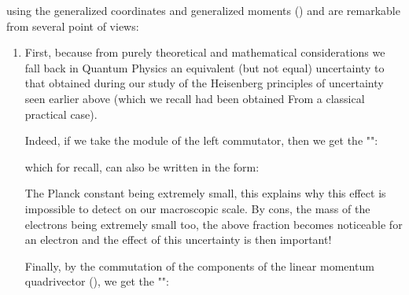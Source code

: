 	using the generalized coordinates and generalized moments () and are remarkable from several point of views:
	\begin{enumerate}
		\item First, because from purely theoretical and mathematical considerations we fall back in Quantum Physics an equivalent (but not equal) uncertainty to that obtained during our study of the Heisenberg principles of uncertainty seen earlier above (which we recall had been obtained From a classical practical case).

		Indeed, if we take the module of the left commutator, then we get the "":
		
		which for recall, can also be written in the form:
		
		The Planck constant being extremely small, this explains why this effect is impossible to detect on our macroscopic scale. By cons, the mass of the electrons being extremely small too, the above fraction becomes noticeable for an electron and the effect of this uncertainty is then important!
		
		Finally, by the commutation of the components of the linear momentum quadrivector (), we get the "":
		

\end{enumerate}
